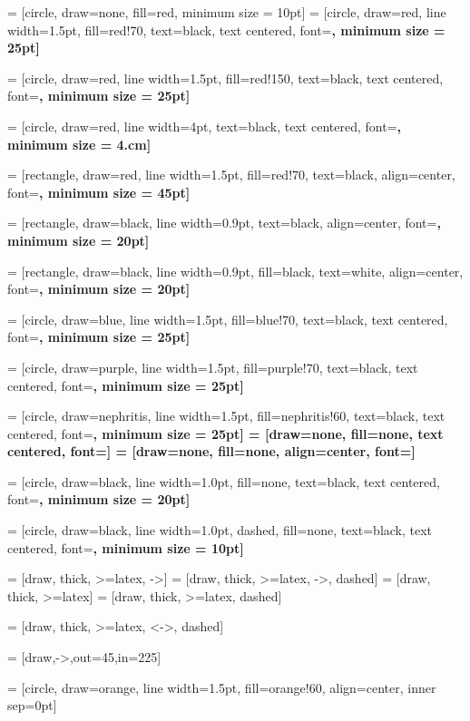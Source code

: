 
 = [circle, draw=none, fill=red, minimum size = 10pt]
 = [circle, draw=red, line width=1.5pt, fill=red!70, text=black, text centered, font=\bf \normalsize, minimum size = 25pt]

 = [circle, draw=red, line width=1.5pt, fill=red!150, text=black, text centered, font=\bf \normalsize, minimum size = 25pt]


 = [circle, draw=red, line width=4pt, text=black, text centered, font=\bf \normalsize, minimum size = 4.cm]

 = [rectangle, draw=red, line width=1.5pt, fill=red!70, text=black, align=center, font=\bf \normalsize, minimum size = 45pt]

 = [rectangle, draw=black, line width=0.9pt, text=black, align=center, font=\bf \normalsize, minimum size = 20pt]

 = [rectangle, draw=black, line width=0.9pt, fill=black, text=white, align=center, font=\bf \normalsize, minimum size = 20pt]

 = [circle, draw=blue, line width=1.5pt, fill=blue!70, text=black, text centered, font=\bf \normalsize, minimum size = 25pt]

 = [circle, draw=purple, line width=1.5pt, fill=purple!70, text=black, text centered, font=\bf \normalsize, minimum size = 25pt]


 = [circle, draw=nephritis, line width=1.5pt, fill=nephritis!60, text=black, text centered, font=\bf \normalsize, minimum size = 25pt]
 = [draw=none, fill=none, text centered, font=\bf \normalsize]
 = [draw=none, fill=none, align=center, font=\bf \normalsize]

 = [circle, draw=black, line width=1.0pt, fill=none, text=black, text centered, font=\bf \normalsize, minimum size = 20pt]

 = [circle, draw=black, line width=1.0pt, dashed, fill=none, text=black, text centered, font=\bf \normalsize, minimum size = 10pt]


  = [draw, thick, >=latex, ->]
  = [draw, thick, >=latex, ->, dashed]
  = [draw, thick, >=latex]
  = [draw, thick, >=latex, dashed]

  = [draw, thick, >=latex, <->, dashed]

 = [draw,->,out=45,in=225]


 = [circle, draw=orange, line width=1.5pt, fill=orange!60, align=center, inner sep=0pt]

